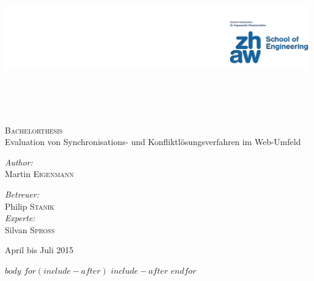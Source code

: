 \documentclass[ oneside,openright,titlepage,numbers=noenddot,headinclude,%
                BCOR=5mm,paper=a4,fontsize=11pt,%
                ngerman,american,%
                ]{scrreprt}
\makeatletter
\def\maxwidth{\ifdim\Gin@nat@width>\linewidth\linewidth
\else\Gin@nat@width\fi}
\let\Oldincludegraphics\includegraphics
\renewcommand{\includegraphics}[1]{\Oldincludegraphics[width=\maxwidth,height=20em,keepaspectratio]{#1}}
\makeatother
\begin{document}
 

\begin{titlepage}

\begin{center}


\includegraphics{./img/zhaw.png}\\[5cm]
\textsc{\Large Bachelorthesis}\\[1cm]
{\huge Evaluation von Synchronisations- und Konfliktlösungsverfahren im Web-Umfeld}\\[6.0cm]


\begin{minipage}{0.4\textwidth}
\begin{flushleft} \large \emph{Author:}\\ Martin \textsc{Eigenmann} \end{flushleft}
\end{minipage} 
\hfill 
\begin{minipage}{0.4\textwidth}
\begin{flushright} 
\large \emph{Betreuer:} \\ Philip \textsc{Stanik} \\[1cm]
\large \emph{Experte:} \\ Silvan \textsc{Spross}
\end{flushright} 
\end{minipage}

\vfill

{\large April bis Juli 2015}
\end{center}
\end{titlepage}

$body$
$for(include-after)$
  $include-after$
$endfor$
\end{document}
